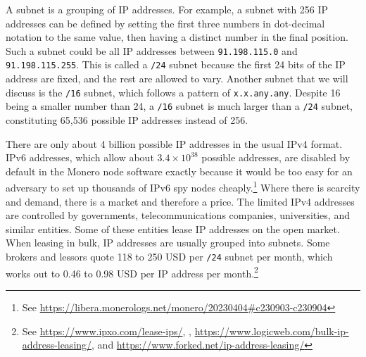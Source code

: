 \documentclass[usletter,11pt,english,openany]{article}
\begin{document}
A subnet is a grouping of IP addresses. For example, a subnet with
256 IP addresses can be defined by setting the first three numbers
in dot-decimal notation to the same value, then having a distinct
number in the final position. Such a subnet could be all IP addresses
between \texttt{91.198.115.0} and \texttt{91.198.115.255}. This is
called a \texttt{/24} subnet because the first 24 bits of the IP address
are fixed, and the rest are allowed to vary. Another subnet that we
will discuss is the \texttt{/16} subnet, which follows a pattern of
\texttt{x.x.any.any}. Despite 16 being a smaller number than 24, a
\texttt{/16} subnet is much larger than a \texttt{/24} subnet, constituting
65,536 possible IP addresses instead of 256.

There are only about 4 billion possible IP addresses in the usual
IPv4 format. IPv6 addresses, which allow about $3.4\times10^{38}$
possible addresses, are disabled by default in the Monero node software
exactly because it would be too easy for an adversary to set up thousands
of IPv6 spy nodes cheaply.\footnote{See \href{https://libera.monerologs.net/monero/20230404\#c230903-c230904}{https://libera.monerologs.net/monero/20230404\#c230903-c230904}}
Where there is scarcity and demand, there is a market and therefore
a price. The limited IPv4 addresses are controlled by governments,
telecommunications companies, universities, and similar entities.
Some of these entities lease IP addresses on the open market. When
leasing in bulk, IP addresses are usually grouped into subnets. Some
brokers and lessors quote 118 to 250 USD per \texttt{/24} subnet per
month, which works out to 0.46 to 0.98 USD per IP address per month.\footnote{See \href{https://www.ipxo.com/lease-ips/}{https://www.ipxo.com/lease-ips/},
, \href{https://www.logicweb.com/bulk-ip-address-leasing/}{https://www.logicweb.com/bulk-ip-address-leasing/},
and \href{https://www.forked.net/ip-address-leasing/}{https://www.forked.net/ip-address-leasing/}}
\end{document}
